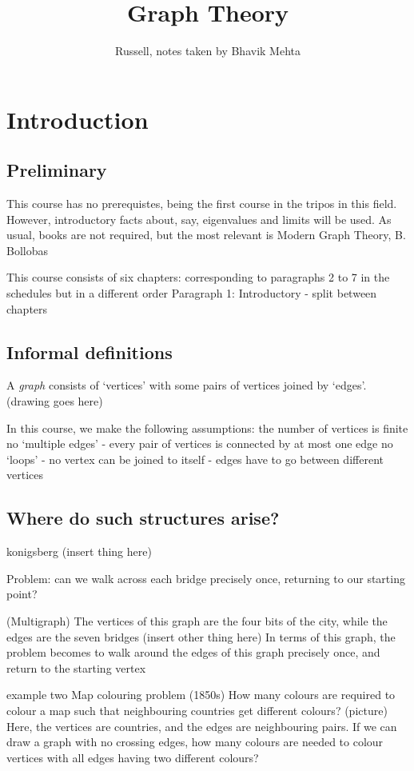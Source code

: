 \documentclass{article}
\title{Graph Theory}
\author{Russell, notes taken by Bhavik Mehta}
\begin{document}
\maketitle

\section{Introduction}

\subsection{Preliminary}
This course has no prerequistes, being the first course in the tripos in this field.  However, introductory facts about, say, eigenvalues and limits will be used.
As usual, books are not required, but the most relevant is Modern Graph Theory, B. Bollobas


This course consists of six chapters: corresponding to paragraphs 2 to 7 in the schedules but in a different order
Paragraph 1: Introductory - split between chapters

\subsection{Informal definitions}
A \emph{graph} consists of `vertices' with some pairs of vertices joined by `edges'. 
(drawing goes here)

In this course, we make the following assumptions:
the number of vertices is finite
no `multiple edges' - every pair of vertices is connected by at most one edge
no `loops' - no vertex can be joined to itself - edges have to go between different vertices

\subsection{Where do such structures arise?}
konigsberg (insert thing here)

Problem: can we walk across each bridge precisely once, returning to our starting point?

(Multigraph) The vertices of this graph are the four bits of the city, while the edges are the seven bridges
(insert other thing here)
In terms of this graph, the problem becomes to walk around the edges of this graph precisely once, and return to the starting vertex

example two
Map colouring problem (1850s)
How many colours are required to colour a map such that neighbouring countries get different colours?
(picture)
Here, the vertices are countries, and the edges are neighbouring pairs.
If we can draw a graph with no crossing edges, how many colours are needed to colour vertices with all edges having two different colours?
\end{document}
